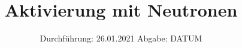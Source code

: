 

\subject{V702}
\title{Aktivierung mit Neutronen}
\date{%
  Durchführung: 26.01.2021
  \hspace{3em}
  Abgabe: DATUM
}



\maketitle
\thispagestyle{empty}
\tableofcontents
\newpage






\printbibliography{}


